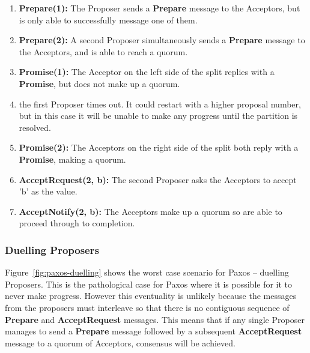 \documentclass[12pt,twoside,notitlepage]{report}
\newcommand{\msg}[1] {{\bf #1}}         %
\begin{document}
\begin{enumerate}
\item \msg{Prepare(1):} The Proposer sends a \msg{Prepare} message to the Acceptors, but is only
	able to successfully message one of them.
\item \msg{Prepare(2):} A second Proposer simultaneously sends a \msg{Prepare} message to the
	Acceptors, and is able to reach a quorum.
\item \msg{Promise(1):} The Acceptor on the left side of the split replies with a \msg{Promise},
	but does not make up a quorum.
\item the first Proposer times out. It could restart with a higher proposal number, but in this
	case it will be unable to make any progress until the partition is resolved.
\item \msg{Promise(2):} The Acceptors on the right side of the split both reply with a
	\msg{Promise}, making a quorum.
\item \msg{AcceptRequest(2, b):} The second Proposer asks the Acceptors to accept 'b' as the
	value.
\item \msg{AcceptNotify(2, b):} The Acceptors make up a quorum so are able to proceed through to
	completion.
\end{enumerate}

\subsubsection*{Duelling Proposers}

Figure~\ref{fig:paxos-duelling} shows the worst case scenario
for Paxos -- duelling Proposers. This is the pathological case for Paxos where it is possible for
it to never make progress. However this eventuality is unlikely because the messages from the proposers
must interleave so that there is no contiguous sequence of \msg{Prepare} and \msg{AcceptRequest}
messages. This means that if any single Proposer manages to send a \msg{Prepare} message followed by a
subsequent \msg{AcceptRequest} message to a quorum of Acceptors, consensus will be achieved.
\end{document}
